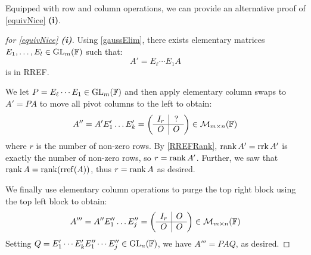 \documentclass[../main.tex]{subfiles}
\begin{document}
Equipped with row and column operations, we can provide an alternative proof of \cref{equivNice} \textbf{(i)}.
\begin{proof}[for \cref{equivNice} \textbf{(i)}]
  Using \cref{gaussElim}, there exists elementary matrices $E_1, \ldots, E_{l} \in \mathrm{GL}_m(\mathbb{F})$ such that:
  \[
    A' = E_{\ell} \cdots E_1 A
  \]
  is in RREF.

  We let $P = E_{\ell} \cdots E_1 \in \mathrm{GL}_m(\mathbb{F})$ and then apply elementary column swaps to $A' = PA$ to move all pivot columns to the left to obtain:
  \[
    A'' = A' E_1' \ldots E_k' = \left(\begin{array}{c|c}
    I_r & ? \\ \hline
    O & O
    \end{array}\right) \in \mathcal{M}_{m \times n}(\mathbb{F})
  \]
  where $r$ is the number of non-zero rows.
  By \cref{RREFRank}, $\operatorname{rank} A' = \operatorname{rrk} A'$ is exactly the number of non-zero rows, so $r = \operatorname{rank} A'$.
  Further, we saw that $\operatorname{rank} A = \operatorname{rank}(\operatorname{rref}(A))$, thus $r = \operatorname{rank} A$ as desired.

  We finally use elementary column operations to purge the top right block using the top left block to obtain:
  \[
    A''' = A'' E_1'' \ldots E_j'' = \left(\begin{array}{c|c}
    I_r & O \\ \hline
    O & O
    \end{array}\right) \in \mathcal{M}_{m \times n}(\mathbb{F})
  \]
  Setting $Q = E_1' \cdots E_k' E_1'' \cdots E_j'' \in \mathrm{GL}_n(\mathbb{F})$, we have $A''' = PAQ$, as desired.
\end{proof}
\end{document}

